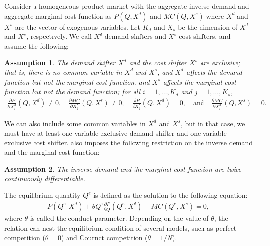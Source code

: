 \documentclass[11pt, a4paper]{article}
\newtheorem{assumption}{Assumption}
\theoremstyle{remark}
\begin{document}
Consider a homogeneous product market with the aggregate inverse demand and aggregate marginal cost function as $P(Q, X^{d})$ and $MC(Q, X^{s})$ where $X^{d}$ and $X^{s}$ are the vector of exogenous variables.
Let $K_d$ and $K_s$ be the dimension of $X^{d}$ and $X^{s}$, respectively.
We call $X^{d}$ demand shifters and $X^{s}$ cost shifters, and assume the following:
\begin{assumption}\label{assumption:exclusive_shifters}
    The demand shifter $X^{d}$ and the cost shifter $X^{s}$ are exclusive; that is, there is no common variable in $X^{d}$ and $X^{s}$, and $X^{d}$ affects the demand function but not the marginal cost function, and $X^{s}$ affects the marginal cost function but not the demand function; for all $i = 1, \ldots, K_d$ and $j = 1, \ldots, K_s$,
    \begin{align}
        \frac{\partial P}{\partial X^{d}_{i}}(Q, X^{d}) \ne 0, \quad \frac{\partial MC}{\partial X^{s}_{j}}(Q, X^{s}) \ne 0, \quad \frac{\partial P}{\partial X^{s}_{j}}(Q, X^{d}) = 0, \quad \text{and} \quad \frac{\partial MC}{\partial X^{d}_{i}}(Q, X^{s}) = 0.
    \end{align}
\end{assumption}
We can also include some common variables in $X^{d}$ and $X^{s}$, but in that case, we must have at least one variable exclusive demand shifter and one variable exclusive cost shifter.
\citet{lau1982identifying} also imposes the following restriction on the inverse demand and the marginal cost function:
\begin{assumption}\label{assumption:twice_differentiable}
    The inverse demand and the marginal cost function are twice continuously differentiable.
\end{assumption}

The equilibrium quantity $Q^e$ is defined as the solution to the following equation:
\begin{align}
    P(Q^e, X^{d}) + \theta Q^e\frac{\partial P}{\partial Q}(Q^e, X^{d}) - MC(Q^e, X^{s}) = 0, \label{eq:foc}
\end{align}
where $\theta$ is called the conduct parameter.
Depending on the value of $\theta$, the relation can nest the equilibrium condition of several models, such as perfect competition ($\theta=0$) and Cournot competition ($\theta=1/N$).
\end{document}
